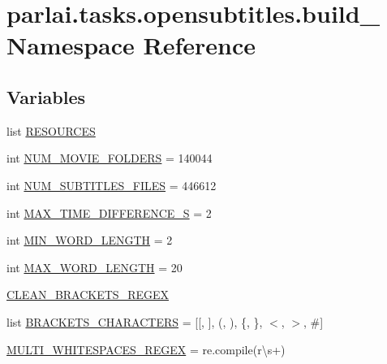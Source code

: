 \hypertarget{namespaceparlai_1_1tasks_1_1opensubtitles_1_1build__2018}{}\section{parlai.\+tasks.\+opensubtitles.\+build\+\_ Namespace Reference}
\label{namespaceparlai_1_1tasks_1_1opensubtitles_1_1build__2018}
\subsection*{Variables}
\begin{DoxyCompactItemize}
\item 
list \hyperlink{namespaceparlai_1_1tasks_1_1opensubtitles_1_1build__2018_ae7c78726d9b7f4c3bd88c4c357d9bc8b}{R\+E\+S\+O\+U\+R\+C\+ES}
\item 
int \hyperlink{namespaceparlai_1_1tasks_1_1opensubtitles_1_1build__2018_a169e02db9ede8d042f030a1900c2d2a5}{N\+U\+M\+\_\+\+M\+O\+V\+I\+E\+\_\+\+F\+O\+L\+D\+E\+RS} = 140044
\item 
int \hyperlink{namespaceparlai_1_1tasks_1_1opensubtitles_1_1build__2018_a579901f247e6d284a7a3fa3895352a3b}{N\+U\+M\+\_\+\+S\+U\+B\+T\+I\+T\+L\+E\+S\+\_\+\+F\+I\+L\+ES} = 446612
\item 
int \hyperlink{namespaceparlai_1_1tasks_1_1opensubtitles_1_1build__2018_a8e950097756090929c6d2d1c91e24f7a}{M\+A\+X\+\_\+\+T\+I\+M\+E\+\_\+\+D\+I\+F\+F\+E\+R\+E\+N\+C\+E\+\_\+S} = 2
\item 
int \hyperlink{namespaceparlai_1_1tasks_1_1opensubtitles_1_1build__2018_a2127a01f8b5dda1504519a67464ac842}{M\+I\+N\+\_\+\+W\+O\+R\+D\+\_\+\+L\+E\+N\+G\+TH} = 2
\item 
int \hyperlink{namespaceparlai_1_1tasks_1_1opensubtitles_1_1build__2018_ac9c453829b8d7a0a33d4dce0a00d8158}{M\+A\+X\+\_\+\+W\+O\+R\+D\+\_\+\+L\+E\+N\+G\+TH} = 20
\item 
\hyperlink{namespaceparlai_1_1tasks_1_1opensubtitles_1_1build__2018_aa6c0d72c5f5b4f7959fa467bf88ad85c}{C\+L\+E\+A\+N\+\_\+\+B\+R\+A\+C\+K\+E\+T\+S\+\_\+\+R\+E\+G\+EX}
\item 
list \hyperlink{namespaceparlai_1_1tasks_1_1opensubtitles_1_1build__2018_a66bc46854a80d30ff62aa64dcaa6d254}{B\+R\+A\+C\+K\+E\+T\+S\+\_\+\+C\+H\+A\+R\+A\+C\+T\+E\+RS} = \mbox{[}\textquotesingle{}\mbox{[}\textquotesingle{}, \textquotesingle{}\mbox{]}\textquotesingle{}, \textquotesingle{}(\textquotesingle{}, \textquotesingle{})\textquotesingle{}, \textquotesingle{}\{\textquotesingle{}, \textquotesingle{}\}\textquotesingle{}, \textquotesingle{}$<$\textquotesingle{}, \textquotesingle{}$>$\textquotesingle{}, \textquotesingle{}\#\textquotesingle{}\mbox{]}
\item 
\hyperlink{namespaceparlai_1_1tasks_1_1opensubtitles_1_1build__2018_a5c1b6cbec3209a9a71111847ff7244f4}{M\+U\+L\+T\+I\+\_\+\+W\+H\+I\+T\+E\+S\+P\+A\+C\+E\+S\+\_\+\+R\+E\+G\+EX} = re.\+compile(r\textquotesingle{}\textbackslash{}s+\textquotesingle{})
\end{DoxyCompactItemize}


